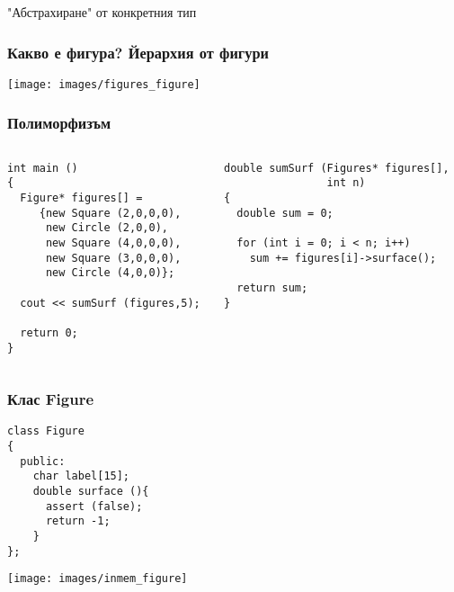 \documentclass{beamer}
\begin{document}
\begin{frame}
\centerline{"Абстрахиране" от конкретния тип}
\end{frame}



\begin{frame}[fragile]
\frametitle{Какво е фигура? Йерархия от фигури}

\begin{center}
\texttt{[image: images/figures\_figure]}
\end{center}

\end{frame}


\begin{frame}[fragile]
\frametitle{Полиморфизъм}


\begin{columns}[t]
  \begin{column}{0.5\textwidth}
\begin{flushleft}
\begin{lstlisting}
int main ()
{
  Figure* figures[] =
     {new Square (2,0,0,0),
      new Circle (2,0,0),
      new Square (4,0,0,0),
      new Square (3,0,0,0),
      new Circle (4,0,0)};

  cout << sumSurf (figures,5);

  return 0;
}
\end{lstlisting}
\end{flushleft}
  \end{column}
  \begin{column}{0.5\textwidth}


\begin{flushleft}
\begin{lstlisting}
double sumSurf (Figures* figures[], 
                int n)
{
  double sum = 0;

  for (int i = 0; i < n; i++)
    sum += figures[i]->surface();

  return sum;
}
\end{lstlisting}
\end{flushleft}

  \end{column}
\end{columns}




\end{frame}


\begin{frame}[fragile]
\frametitle{Клас Figure}


\begin{flushleft}
\begin{lstlisting}
class Figure
{
  public:
    char label[15];
    double surface (){
      assert (false);
      return -1;
    }
};
\end{lstlisting}
\end{flushleft}


\begin{center}
\texttt{[image: images/inmem\_figure]}
\end{center}


\end{frame}
\end{document}
